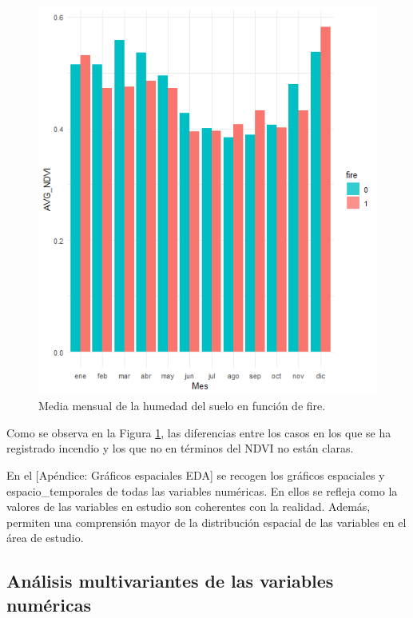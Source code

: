 \documentclass[12pt,a4paper,]{book}
\numberwithin{dummy}{section}
\theoremstyle{ocrenumbox}
\theoremstyle{blacknumex}
\theoremstyle{blacknumbox}
\theoremstyle{ocrenum}
\theoremstyle{ocrenum}
\begin{document}
\begin{figure}[h]
\centering
\includegraphics[]{graficos/NDVI_mes.png}
\caption{Media mensual de la humedad del suelo en función de fire.}
\label{fig:NDVI_mes}
\end{figure}

Como se observa en la Figura \ref{fig:NDVI_mes}, las diferencias entre
los casos en los que se ha registrado incendio y los que no en términos
del NDVI no están claras.

En el {[}Apéndice: Gráficos espaciales EDA{]} se recogen los gráficos
espaciales y espacio\_temporales de todas las variables numéricas. En
ellos se refleja como la valores de las variables en estudio son
coherentes con la realidad. Además, permiten una comprensión mayor de la
distribución espacial de las variables en el área de estudio.

\hypertarget{anuxe1lisis-multivariantes-de-las-variables-numuxe9ricas}{%
\subsection{Análisis multivariantes de las variables
numéricas}\label{anuxe1lisis-multivariantes-de-las-variables-numuxe9ricas}}
\end{document}
